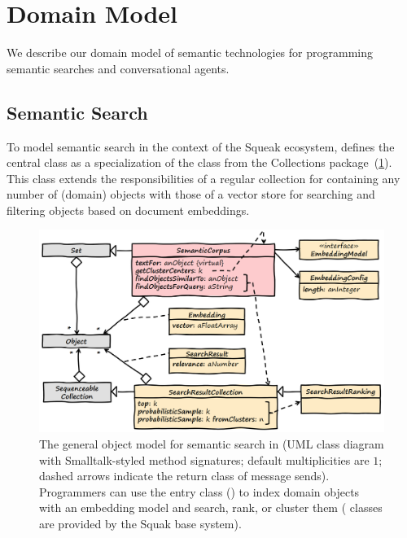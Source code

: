 
\section{Domain Model}
\label{sec:semtex/model}

We describe our domain model of semantic technologies for programming semantic searches and conversational agents.

\subsection*{Semantic Search}
\label{sec:semtex/model/search}

To model semantic search in the context of the Squeak ecosystem, \semtex defines the central class  as a specialization of the  class from the Collections package~(\cref{fig:semtex/model/search}).
This class extends the responsibilities of a regular collection for containing any number of (domain) objects with those of a vector store for searching and filtering objects based on document embeddings.

\begin{figure}
	\centering
	\includegraphics[width=\textwidth]{01_model/search.png}
	\caption[The object model for semantic search in \semtex.]{
		The general object model for semantic search in \semtex (UML class diagram with Smalltalk-styled method signatures; default multiplicities are $1$; dashed arrows indicate the return class of message sends).
		Programmers can use the entry class  (\bold{\textcolor[HTML]{c00000}{red}}) to index domain objects with an embedding model and search, rank, or cluster them (\bold{\textcolor{gray}{gray}} classes are provided by the Squak base system).
	}
	\label{fig:semtex/model/search}
\end{figure}

